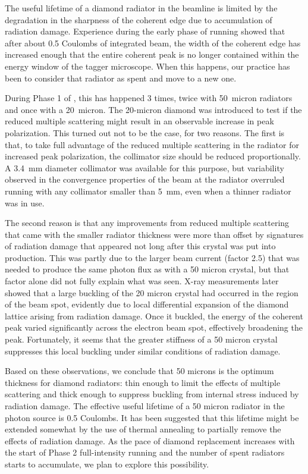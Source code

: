 The useful lifetime of a diamond radiator in the \GX{} beamline is limited by the 
degradation in the sharpness of the coherent edge due to accumulation of radiation damage.
Experience during the early phase of \GX{} running showed that after
about 0.5 Coulombs of integrated beam, the width of the coherent edge has
increased enough that the entire coherent peak is no longer contained within the energy
window of the tagger microscope. When this happens, our practice has been to consider that
radiator as spent and move to a new one.

During Phase 1 of \GX{}, this has happened 3
times, twice with 50~micron radiators and once with a 20~micron. The 20-micron
diamond was introduced to test if the reduced multiple scattering might result in an
observable increase in peak polarization. This turned out not to be the case, for
two reasons. The first is that, to take full advantage of the reduced multiple
scattering in the radiator for increased peak polarization, the collimator size 
should be reduced proportionally. A 3.4~mm diameter collimator was available for
this purpose, but variability observed in the convergence properties of the
beam at the radiator overruled running with any collimator smaller than 5~mm,
even when a thinner radiator was in use.

The second reason is that any improvements
from reduced multiple scattering that came with the smaller radiator thickness
were more than offset by signatures of radiation
damage that appeared not long after this crystal was put into production.
This was partly due to the larger beam current (factor 2.5) that was needed to
produce the same photon flux as with a 50 micron crystal, but that factor alone
did not fully
explain what was seen. X-ray measurements later showed that a large buckling of
the 20 micron crystal had occurred in the region of the beam spot, evidently
due to  local differential expansion of the diamond lattice arising from
radiation damage. Once it buckled, the energy of the coherent
peak varied significantly across the electron beam spot, effectively broadening
the peak. Fortunately, it seems that the greater stiffness of a 50 micron crystal
suppresses this local buckling under similar conditions of radiation damage.

Based on these observations, we conclude that 50 microns is the
optimum thickness for \GX{} diamond radiators: thin enough to limit the effects
of multiple scattering and thick enough to suppress buckling from internal stress
induced by radiation damage. The effective useful lifetime of a 50 micron radiator
in the photon source is 0.5 Coulombs. It has been suggested that this lifetime
might be extended somewhat by the use of thermal annealing to partially remove the
effects of radiation damage. As the pace of diamond replacement increases with the
start of \GX{} Phase 2 full-intensity running and the number of spent radiators
starts to accumulate, we plan to explore this possibility.

